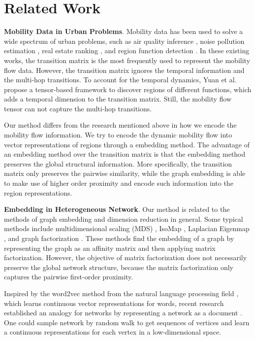 \section{Related Work}
\label{sec:related}

\textbf{Mobility Data in Urban Problems}. Mobility data has been used to solve a wide spectrum of urban problems, such as air quality inference \cite{zheng2013u}, noise pollution estimation \cite{zheng2014diagnosing}, real estate ranking \cite{fu2014sparse}, and region function detection \cite{pan2013land,qi2011measuring}. In these existing works, the transition matrix is the most frequently used to represent the mobility flow data. However, the transition matrix ignores the temporal information and the multi-hop transitions. To account for the temporal dynamics, Yuan et al. \cite{yuan2012discovering} propose a tensor-based framework to discover regions of different functions, which adds a temporal dimension to the transition matrix. Still, the mobility flow tensor can not capture the multi-hop transitions.


 
Our method differs from the research mentioned above in how we encode the mobility flow information. We try to encode the dynamic mobility flow into vector representations of regions through a embedding method. The advantage of an embedding method over the transition matrix is that the embedding method preserves the global structural information. More specifically, the transition matrix only preserves the pairwise similarity, while the graph embedding is able to make use of higher order proximity and encode such information into the region representations.


\textbf{Embedding in Heterogeneous Network}. Our method is related to the methods of graph embedding and dimension reduction in general. Some typical methods include multidimensional scaling (MDS) \cite{cox2000multidimensional}, IsoMap \cite{tenenbaum2000global}, Laplacian Eigenmap \cite{belkin2001laplacian}, and graph factorization \cite{ahmed2013distributed}. These methods find the embedding of a graph by representing the graph as an affinity matrix and then applying matrix factorization. However, the objective of matrix factorization does not necessarily preserve the global network structure, because the matrix factorization only captures the pairwise first-order proximity. 

Inspired by the word2vec method from the natural language processing field \cite{mikolov2013linguistic, mikolov2013efficient, mikolov2013distributed}, which learns continuous vector representations for words, recent research established an analogy for networks by representing a network as a document \cite{perozzi2014deepwalk,tang2015line,grovernode2vec}. One could sample network by random walk to get sequences of vertices and learn a continuous representations for each vertex in a low-dimensional space.

